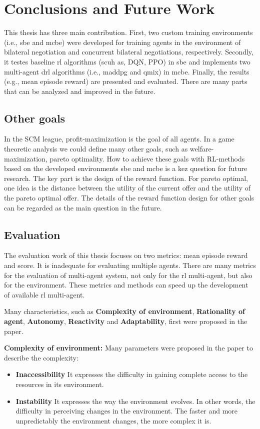 \chapter{Conclusions and Future Work}
This thesis has three main contribution. First, two custom training environments (i.e., \gls{sbe} and \gls{mcbe}) were developed for training agents in the environment of bilateral negotiation and concurrent bilateral negotiations, respectively. Secondly, it testes baseline \gls{rl} algorithms (scuh as, DQN, PPO) in \gls{sbe} and implements two multi-agent drl algorithms (i.e., maddpg and qmix) in \gls{mcbe}. Finally, the results (e.g., mean episode reward) are presented and evaluated. There are many parts that can be analyzed and improved in the future.

\section{Other goals}
In the SCM league, profit-maximization is the goal of all agents. In a game theoretic analysis we could define many other goals, such as welfare-maximization, pareto optimality. How to achieve these goals with RL-methods based on the developed environments \gls{sbe} and \gls{mcbe} is a kez question for future research. The key part is the design of the reward function. For pareto optimal, one idea is the distance between the utility of the current offer and the utility of the pareto optimal offer. The details of the reward function design for other goals can be regarded as the main question in the future.

\section{Evaluation}
The evaluation work of this thesis focuses on two metrics: mean episode reward and score. It is inadequate for evaluating multiple agents. There are many metrics for the evaluation of multi-agent system, not only for the \gls{rl} multi-agent, but also for the environment. These metrics and methods can speed up the development of available \gls{rl} multi-agent. 

Many characteristics, such as \textbf{Complexity of environment}, \textbf{Rationality of agent}, \textbf{Autonomy}, \textbf{Reactivity} and \textbf{Adaptability}, first were proposed in the paper\parencite{Bitonto2010}.

\textbf{Complexity of environment:} Many parameters were proposed in the paper to describe the complexity:
\begin{itemize}
\item \textbf{Inaccessibility} It expresses the difficulty in gaining complete access to the resources in its environment.
\item \textbf{Instability} It expresses the way the environment evolves. In other words, the difficulty in perceiving changes in the environment. The faster and more unpredictably the environment changes, the more complex it is.
\end{itemize}

